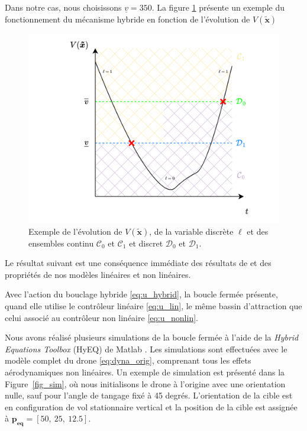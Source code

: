 Dans notre cas, nous choisissons $\underline{v}= 350$. La figure \ref*{fig:ensembletrnaistion} présente un exemple du fonctionnement du mécanisme hybride en fonction de l'évolution de $V(\boldsymbol{\tilde x})$

\begin{figure}[ht!]
  \centering
  \includegraphics[trim=0cm 0cm 0cm 0cm,clip,width=0.8\columnwidth]{figures/transition.png}
  \caption{Exemple de l'évolution de $V(\boldsymbol{\tilde x})$, de la variable discrète $\ell$ et des ensembles continu $\mathcal{C}_{0}$ et $ \mathcal{C}_{1}$ et discret $\mathcal{D}_{0}$ et $\mathcal{D}_{1}$.}
  \label{fig:ensembletrnaistion}
\end{figure}

Le résultat suivant est une conséquence immédiate des résultats de \cite[Ex. 1.7]{65} et des propriétés de nos modèles linéaires et non linéaires.

\begin{proposition}
    Avec l'action du bouclage hybride \eqref{eq:u_hybrid}, la boucle fermée présente, quand elle utilise le contrôleur linéaire \eqref{eq:u_lin}, le même bassin d'attraction que celui associé au contrôleur non linéaire \eqref{eq:u_nonlin}.
\end{proposition}

Nous avons réalisé plusieurs simulations de la boucle fermée à l'aide de la \textit{Hybrid Equations Toolbox} (HyEQ) de Matlab \cite{sanfelice_2017}. Les simulations sont effectuées avec le modèle complet du drone \eqref{eq:dyna_orig}, comprenant tous les effets aérodynamiques non linéaires. Un exemple de simulation est présenté dans la Figure~\ref{fig_sim}, où nous initialisons le drone à l'origine avec une orientation nulle, sauf pour l'angle de tangage fixé à 45 degrés. L'orientation de la cible est en configuration de vol stationnaire vertical et la position de la cible est assignée à $\boldsymbol{p_{\text{eq}}} = [50,~25,~12.5]$.

